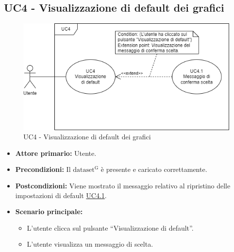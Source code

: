 \subsection{UC4 - Visualizzazione di default dei grafici}
\label{sec:UC4}
\begin{figure}[h!]
    \centering
    \includegraphics[scale=0.60]{../../assets/visualizzazione_default.png}
	\caption{UC4 - Visualizzazione di default dei grafici}
\end{figure}

\begin{itemize}
	\item \textbf{Attore primario:} Utente.
	\item \textbf{Precondizioni:} Il ${\mathrm{dataset^{G}}}$ è presente e caricato correttamente.
	\item \textbf{Postcondizioni:} Viene mostrato il messaggio relativo al ripristino delle impostazioni di default \hyperref[sec:UC4.1]{UC4.1}.
	\item \textbf{Scenario principale:}
	\begin{itemize}
		\item L'utente clicca sul pulsante ``Visualizzazione di default''.
		\item L'utente visualizza un messaggio di scelta.
	\end{itemize}
\end{itemize}

